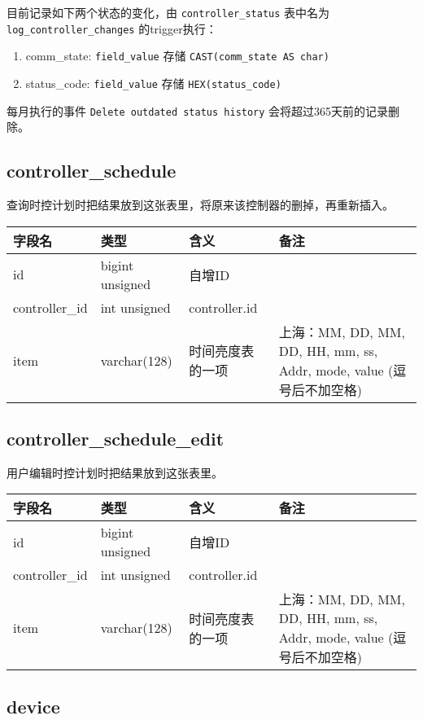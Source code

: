 目前记录如下两个状态的变化，由 \texttt{controller\_status} 表中名为
\texttt{log\_controller\_changes} 的trigger执行：

\begin{enumerate}
\def\labelenumi{\arabic{enumi}.}
\itemsep1pt\parskip0pt
\item
  comm\_state: \texttt{field\_value} 存储
  \texttt{CAST(comm\_state AS char)}
\item
  status\_code: \texttt{field\_value} 存储 \texttt{HEX(status\_code)}
\end{enumerate}

每月执行的事件 \texttt{Delete outdated status history}
会将超过365天前的记录删除。

\subsection{controller\_schedule}\label{controllerux5fschedule}

查询时控计划时把结果放到这张表里，将原来该控制器的删掉，再重新插入。

\begin{longtabu}[c]{@{}lXXX@{}}
\toprule
字段名 & 类型 & 含义 & 备注\tabularnewline
\midrule
\endhead
id & bigint unsigned & 自增ID &\tabularnewline
controller\_id & int unsigned & controller.id &\tabularnewline
item & varchar(128) & 时间亮度表的一项 & 上海：MM, DD, MM, DD, HH, mm,
ss, Addr, mode, value (逗号后不加空格)\tabularnewline
\bottomrule
\end{longtabu}

\subsection{controller\_schedule\_edit}\label{controllerux5fscheduleux5fedit}

用户编辑时控计划时把结果放到这张表里。

\begin{longtabu}[c]{@{}lXXX@{}}
\toprule
字段名 & 类型 & 含义 & 备注\tabularnewline
\midrule
\endhead
id & bigint unsigned & 自增ID &\tabularnewline
controller\_id & int unsigned & controller.id &\tabularnewline
item & varchar(128) & 时间亮度表的一项 & 上海：MM, DD, MM, DD, HH, mm,
ss, Addr, mode, value (逗号后不加空格)\tabularnewline
\bottomrule
\end{longtabu}

\subsection{device}\label{device}

